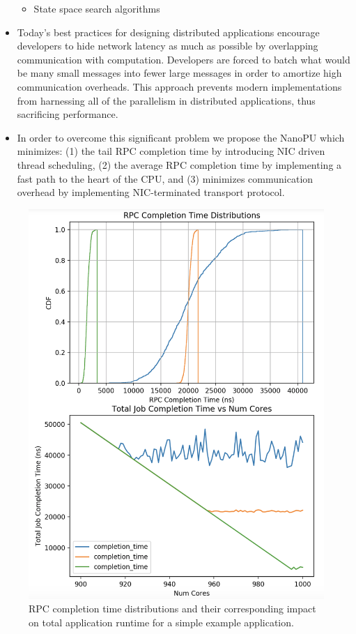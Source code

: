\begin{itemize}
\begin{itemize}
        \item State space search algorithms
    \end{itemize}
    \item Today's best practices for designing distributed applications encourage developers to hide network latency as much as possible by overlapping communication with computation. Developers are forced to batch what would be many small messages into fewer large messages in order to amortize high communication overheads. This approach prevents modern implementations from harnessing all of the parallelism in distributed applications, thus sacrificing performance.
    \item In order to overcome this significant problem we propose the NanoPU which minimizes: (1) the tail RPC completion time by introducing NIC driven thread scheduling, (2) the average RPC completion time by implementing a fast path to the heart of the CPU, and (3) minimizes communication overhead by implementing NIC-terminated transport protocol.
\end{itemize}

\begin{figure}
  \includegraphics[width=\linewidth]{./figures/nanoservice-sim}
  \caption{RPC completion time distributions and their corresponding impact on total application runtime for a simple example application.}
  \label{fig:nanoservice-sim}
\end{figure}